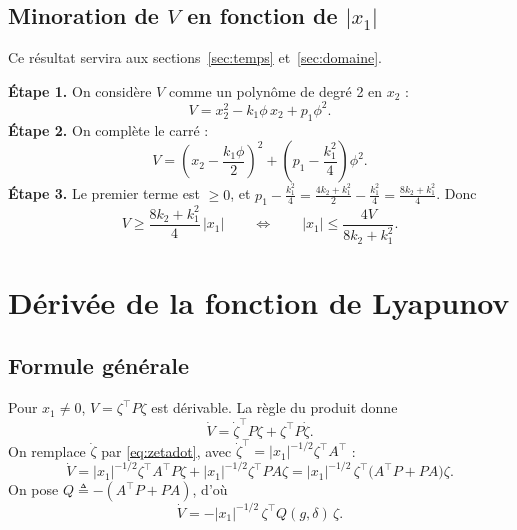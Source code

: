 \documentclass[11pt,a4paper]{article}
\numberwithin{equation}{section}
\theoremstyle{plain}
\theoremstyle{definition}
\theoremstyle{remark}
\begin{document}
\subsection{Minoration de $V$ en fonction de $|x_1|$}
Ce résultat servira aux sections~\ref{sec:temps} et~\ref{sec:domaine}.

\textbf{Étape 1.} On considère $V$ comme un polynôme de degré 2 en $x_2$ :
\begin{equation}
V = x_2^2 - k_1\phi\,x_2 + p_1\phi^2 .
\end{equation}
\textbf{Étape 2.} On complète le carré :
\begin{equation}
V = \left(x_2-\frac{k_1\phi}{2}\right)^2 + \left(p_1-\frac{k_1^2}{4}\right)\phi^2 .
\end{equation}
\textbf{Étape 3.} Le premier terme est $\ge0$, et $p_1-\frac{k_1^2}{4} = \frac{4k_2+k_1^2}{2}-\frac{k_1^2}{4} = \frac{8k_2+k_1^2}{4}$. Donc
\begin{equation}\label{eq:Vmin}
\boxed{V\ge\frac{8k_2+k_1^2}{4}\,|x_1|
\qquad\Longleftrightarrow\qquad |x_1|\le\frac{4V}{8k_2+k_1^2}.}
\end{equation}

\section{Dérivée de la fonction de Lyapunov}

\subsection{Formule générale}
Pour $x_1\neq0$, $V=\zeta^\top P\zeta$ est dérivable. La règle du produit donne
\begin{equation}
\dot V = \dot\zeta^\top P\zeta + \zeta^\top P\dot\zeta .
\end{equation}
On remplace $\dot\zeta$ par \eqref{eq:zetadot}, avec $\dot\zeta^\top = |x_1|^{-1/2}\zeta^\top A^\top$ :
\begin{equation}
\dot V = |x_1|^{-1/2}\zeta^\top A^\top P\zeta + |x_1|^{-1/2}\zeta^\top PA\zeta
= |x_1|^{-1/2}\,\zeta^\top\big(A^\top P+PA\big)\zeta .
\end{equation}
On pose $Q\triangleq-(A^\top P+PA)$, d'où
\begin{equation}\label{eq:Vdot}
\boxed{\dot V = -|x_1|^{-1/2}\,\zeta^\top Q(g,\delta)\,\zeta .}
\end{equation}
\end{document}

